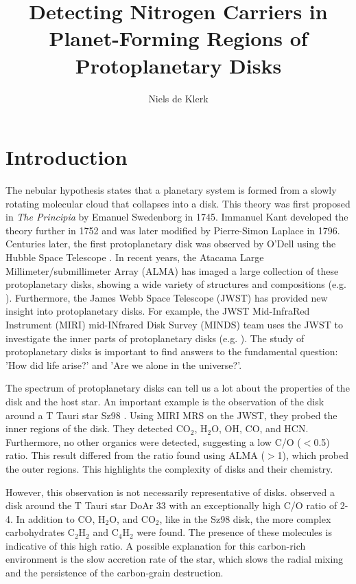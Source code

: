 \documentclass[oneside, single, authoryear, semicolon, 12pt]{lion-msc}
\title{Detecting Nitrogen Carriers in Planet-Forming Regions of Protoplanetary Disks}
\author{Niels de Klerk}
\affiliation{Leiden Observatory, Universiteit Leiden}
\date{\displaydate{date}}
\newcommand{\4}{$_4$}
\newcommand{\3}{$_3$}
\newcommand{\2}{$_2$}
\begin{document}

\maketitle

\tableofcontents
\cleardoublepage
{}
\chapter{Introduction}
The nebular hypothesis states that a planetary system is formed from a slowly rotating molecular cloud that collapses into a disk. This theory was first proposed in \textit{The Principia} by Emanuel Swedenborg in 1745. Immanuel Kant developed the theory further in 1752 and was later modified by Pierre-Simon Laplace in 1796. Centuries later, the first protoplanetary disk was observed by O'Dell using the Hubble Space Telescope \citep{ODell1993}. In recent years, the Atacama Large Millimeter/submillimeter Array (ALMA) has imaged a large collection of these protoplanetary disks, showing a wide variety of structures and compositions (e.g. \cite{Andrews_2018, ALMA2015}). Furthermore, the James Webb Space Telescope (JWST) has provided new insight into protoplanetary disks. For example, the JWST Mid-InfraRed Instrument (MIRI) mid-INfrared Disk Survey (MINDS) team uses the JWST to investigate the inner parts of protoplanetary disks (e.g. \cite{Kamp_2023, henning2024mindsjwstmirimidinfrared}). The study of protoplanetary disks is important to find answers to the fundamental question: 'How did life arise?' and 'Are we alone in the universe?'.

The spectrum of protoplanetary disks can tell us a lot about the properties of the disk and the host star. An important example is the observation of the disk around a T Tauri star Sz98 \citep{Gasman_2023}. Using MIRI MRS on the JWST, they probed the inner regions of the disk. They detected CO$_2$, H$_2$O, OH, CO, and HCN. Furthermore, no other organics were detected, suggesting a low C/O ($<$0.5) ratio. This result differed from the ratio found using ALMA ($>$1), which probed the outer regions. This highlights the complexity of disks and their chemistry.

However, this observation is not necessarily representative of disks. \cite{colmenares2024jwstmiridetectioncarbonrichchemistry} observed a disk around the T Tauri star DoAr 33 with an exceptionally high C/O ratio of 2-4. In addition to CO, H\2O, and CO\2, like in the Sz98 disk, the more complex carbohydrates C\2H\2 and C\4H\2 were found. The presence of these molecules is indicative of this high ratio. A possible explanation for this carbon-rich environment is the slow accretion rate of the star, which slows the radial mixing and the persistence of the carbon-grain destruction.
\end{document}
